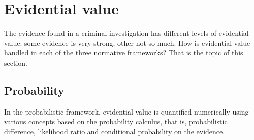 \documentclass[10pt]{article}
\begin{document}
\section{Evidential value}
\label{sec:str}

The evidence found in a criminal investigation has different levels of evidential value: some evidence is very strong, other not so much. How is evidential value handled in each of the three normative frameworks? That is the topic of this section.

\subsection{Probability}

In the probabilistic framework, evidential value is quantified numerically using various 
concepts based 
on the probability calculus, that is, 
probabilistic difference, likelihood ratio and conditional probability on the evidence.
	
\end{document}
